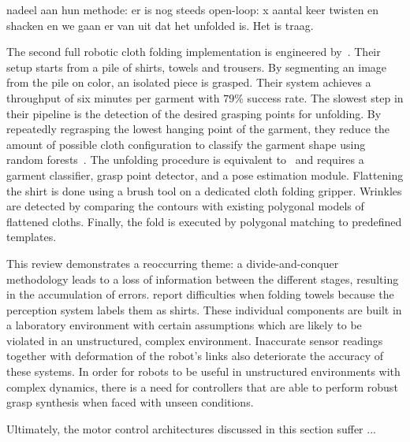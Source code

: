 \documentclass[\home/main.tex]{subfiles}
\begin{document}
		nadeel aan hun methode: er is nog steeds open-loop: x aantal keer twisten en shacken en we gaan er van uit dat het unfolded is. Het is traag. 


	The second full robotic cloth folding implementation is engineered by~\citeauthor{Doumanoglou2016}. Their setup starts from a pile of shirts, towels and trousers. By segmenting an image from the pile on color, an isolated piece is grasped. 
	Their system achieves a throughput of six minutes per garment with $79\%$ success rate. The slowest step in their pipeline is the detection of the desired grasping points for unfolding. By repeatedly regrasping the lowest hanging point of the garment, they reduce the amount of possible cloth configuration to classify the garment shape using random forests~\autocite{Breiman2001}. The unfolding procedure is equivalent to~\autocite{Maitin2010} and requires a garment classifier, grasp point detector, and a pose estimation module. Flattening the shirt is done using a brush tool on a dedicated cloth folding gripper. Wrinkles are detected by comparing the contours with existing polygonal models of flattened cloths.  Finally, the fold is executed by polygonal matching to predefined templates. 
			

This review demonstrates a reoccurring theme: a divide-and-conquer methodology leads to a loss of information between the different stages, resulting in the accumulation of errors. \textcite{Doumanoglou2016} report difficulties when folding towels because the perception system labels them as shirts. These individual components are built in a laboratory environment with certain assumptions which are likely to be violated in an unstructured, complex environment. Inaccurate sensor readings together with deformation of the robot’s links also deteriorate the accuracy of these systems. In order for robots to be useful in unstructured environments with complex dynamics, there is a need for controllers that are able to perform robust grasp synthesis when faced with unseen conditions.



Ultimately, the motor control architectures discussed in this section suffer ...
\end{document}
